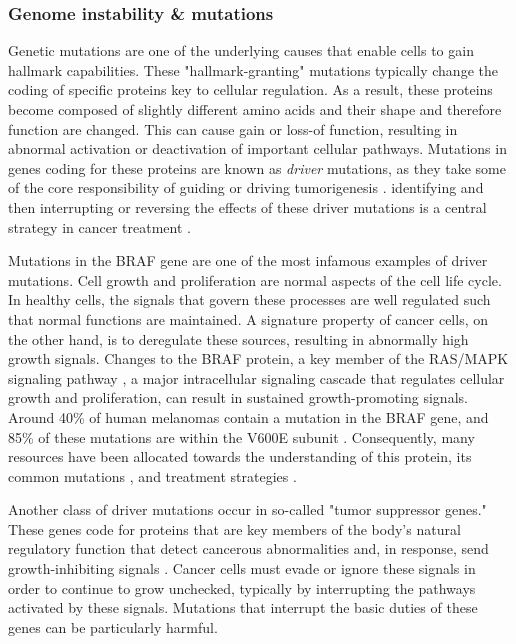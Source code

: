 \subsubsection{Genome instability \& mutations} \label{sec:cancer-mutations}
Genetic mutations are one of the underlying causes that enable cells to gain hallmark capabilities.
These "hallmark-granting" mutations typically change the coding of specific proteins key to cellular regulation.
As a result, these proteins become composed of slightly different amino acids and their shape and therefore function are changed.
This can cause gain or loss-of function, resulting in abnormal activation or deactivation of important cellular pathways.
Mutations in genes coding for these proteins are known as \emph{driver} mutations, as they take some of the core responsibility of guiding or driving tumorigenesis \cite{martinez-jimenez2020}.
identifying and then interrupting or reversing the effects of these driver mutations is a central strategy in cancer treatment \cite{need}.

Mutations in the BRAF gene are one of the most infamous examples of driver mutations.
Cell growth and proliferation are normal aspects of the cell life cycle.
In healthy cells, the signals that govern these processes are well regulated such that normal functions are maintained.
A signature property of cancer cells, on the other hand, is to deregulate these sources, resulting in abnormally high growth signals.
Changes to the BRAF protein, a key member of the RAS/MAPK signaling pathway \cite{davies2010}, a major intracellular signaling cascade that regulates cellular growth and proliferation,
can result in sustained growth-promoting signals.
Around 40\% of human melanomas contain a mutation in the BRAF gene, and 
85\% of these mutations are within the V600E subunit \cite{spathis2019}.
Consequently, many resources have been allocated towards the understanding of this protein, its common mutations \cite{smiech2020}, and treatment strategies \cite{cheng2017}.

Another class of driver mutations occur in so-called "tumor suppressor genes."
These genes code for proteins that are key members of the body's natural regulatory function that detect cancerous abnormalities and, in response, send growth-inhibiting signals \cite{joyce2024}.
Cancer cells must evade or ignore these signals in order to continue to grow unchecked,
typically by interrupting the pathways activated by these signals.
Mutations that interrupt the basic duties of these genes can be particularly harmful.

